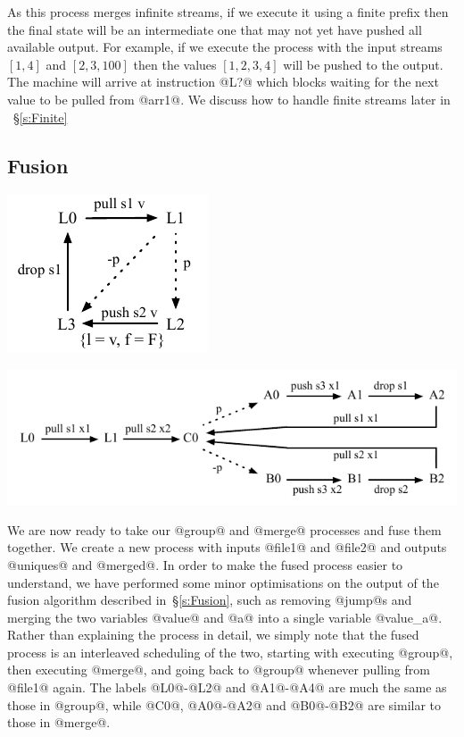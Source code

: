 As this process merges infinite streams, if we execute it using a finite prefix then the final state will be an intermediate one that may not yet have pushed all available output. For example, if we execute the process with the input streams $[1, 4]$ and $[2, 3, 100]$ then the values $[1, 2, 3, 4]$ will be pushed to the output. The machine will arrive at instruction @L?@ which blocks waiting for the next value to be pulled from @arr1@. We discuss how to handle finite streams later in ~\S\ref{s:Finite}




\subsection{Fusion}
\includegraphics[scale=1.1]{figures/state-group.pdf}

\includegraphics[scale=1.1]{figures/state-merge.pdf}


We are now ready to take our @group@ and @merge@ processes and fuse them together. 
We create a new process with inputs @file1@ and @file2@ and outputs @uniques@ and @merged@.
In order to make the fused process easier to understand, we have performed some minor optimisations on the output of the fusion algorithm described in~\S\ref{s:Fusion}, such as removing @jump@s and merging the two variables @value@ and @a@ into a single variable @value_a@.
Rather than explaining the process in detail, we simply note that the fused process is an interleaved scheduling of the two, starting with executing @group@, then executing @merge@, and going back to @group@ whenever pulling from @file1@ again.
The labels @L0@-@L2@ and @A1@-@A4@ are much the same as those in @group@, while @C0@, @A0@-@A2@ and @B0@-@B2@ are similar to those in @merge@.

